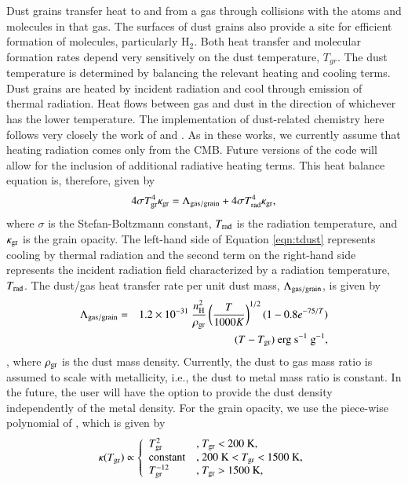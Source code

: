Dust grains transfer heat to and from a gas through collisions
with the atoms and molecules in that gas.  The surfaces of dust grains
also provide a site for efficient formation of molecules, particularly
H$_{2}$.  Both heat transfer and molecular formation rates depend very
sensitively on the dust temperature, $T_{gr}$.  The dust temperature
is determined by balancing the relevant heating and cooling terms.
Dust grains are heated by incident radiation and cool through emission
of thermal
radiation.  Heat flows between gas and dust in the direction of
whichever has the lower temperature.  The implementation of
dust-related chemistry here follows very closely the work of
\citet{2000ApJ...534..809O} and \citet{2005ApJ...626..627O}.  As in
these works, we currently assume that heating radiation comes only
from the CMB.  Future versions of the code will allow for the
inclusion of additional radiative heating terms.  This heat balance
equation is, therefore, given by
\begin{equation} \label{eqn:tdust}
4 \sigma T_{\rm gr}^{4} \kappa_{\rm gr} = \Lambda_{\rm gas/grain} + 4 \sigma
T_{\rm rad}^{4} \kappa_{\rm gr},
\end{equation}
where $\sigma$ is the Stefan-Boltzmann constant, $T_{\rm rad}$ is the
radiation temperature, and $\kappa_{\rm gr}$ is the grain opacity.  The
left-hand side of Equation \ref{eqn:tdust} represents cooling by
thermal radiation and the second term on the right-hand side
represents the incident radiation field characterized by a radiation
temperature, $T_{\rm rad}$.  The dust/gas heat transfer rate per unit dust
mass, $\Lambda_{\rm gas/grain}$, is given by
\begin{eqnarray} \label{eqn:gasdust}
\Lambda_{\rm gas/grain} & = & 1.2\times10^{-31}~\frac{n_{\rm H}^{2}}{\rho_{\rm gr}}
\left(\frac{T}{1000 K}\right)^{1/2} (1 - 0.8 e^{-75 / T})  \nonumber \\
& & (T - T_{\rm gr})~\textrm{erg~s$^{-1}$~g$^{-1}$},
\end{eqnarray}
\citep{1989ApJ...342..306H}, where $\rho_{\rm gr}$ is the dust mass density.  Currently,
the dust to gas mass ratio is assumed to scale with metallicity, i.e.,
the dust to metal mass ratio is constant.  In the future, the user
will have the option to provide the dust density independently of the
metal density.  For the grain opacity, we use the piece-wise
polynomial of \citet{2011ApJ...729L...3D}, which is given by
\begin{equation}
\kappa(T_{\rm gr}) \propto \left\{ \begin{array}{ll}
T_{\rm gr}^{2} & \textrm{, $T_{\rm gr}$ $<$ 200~K,}\\
\textrm{constant} & \textrm{, 200~K $<$ $T_{\rm gr}$ $<$ 1500~K,}\\
T_{\rm gr}^{-12} & \textrm{, $T_{\rm gr}$ $>$ 1500~K},
\end{array} \right.
\end{equation}
